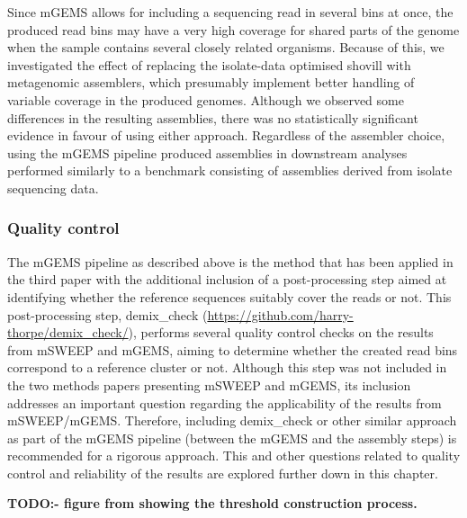 \documentclass[officiallayout]{tktla}
\begin{document}
Since mGEMS allows for including a sequencing read in several bins at
once, the produced read bins may have a very high coverage for shared
parts of the genome when the sample contains several closely related
organisms. Because of this, we investigated the effect of replacing
the isolate-data optimised shovill with metagenomic assemblers, which
presumably implement better handling of variable coverage in the
produced genomes. Although we observed some differences in the
resulting assemblies, there was no statistically significant evidence
in favour of using either approach. Regardless of the assembler
choice, using the mGEMS pipeline produced assemblies in downstream
analyses performed similarly to a benchmark consisting of assemblies
derived from isolate sequencing data.

\subsubsection{Quality control}

The mGEMS pipeline as described above is the method that has been
applied in the third paper with the additional inclusion of a
post-processing step aimed at identifying whether the reference
sequences suitably cover the reads or not. This post-processing step,
demix\_check (\url{https://github.com/harry-thorpe/demix_check/}),
performs several quality control checks on the results from mSWEEP and
mGEMS, aiming to determine whether the created read bins correspond to
a reference cluster or not. Although this step was not included in the
two methods papers presenting mSWEEP and mGEMS, its inclusion
addresses an important question regarding the applicability of the
results from mSWEEP/mGEMS. Therefore, including demix\_check
\textemdash or other similar approach \textemdash as part of the mGEMS
pipeline (between the mGEMS and the assembly steps) is recommended for
a rigorous approach. This and other questions related to quality
control and reliability of the results are explored further down in
this chapter.

\textbf{TODO:- figure from showing the threshold construction process.}
\end{document}
